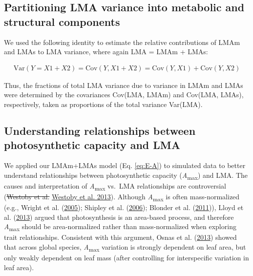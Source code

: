 \documentclass[
  12pt,
]{article}
\providecommand{\DIFdeltex}[1]{{\protect\color{red}\sout{#1}}}                      %
\providecommand{\DIFaddbegin}{} %
\providecommand{\DIFaddend}{} %
\providecommand{\DIFdelbegin}{} %
\providecommand{\DIFdelend}{} %
\providecommand{\DIFdel}[1]{\texorpdfstring{\DIFdeltex{#1}}{}} %
\newcommand{\DIFscaledelfig}{0.5}
\newlength{\DIFdelgraphicswidth} %
\newlength{\DIFdelgraphicsheight} %
\newcommand{\DIFaddincludegraphics}[2][]{{\color{blue}\fbox{\DIFOincludegraphics[#1]{#2}}}} %
\newcommand{\DIFdelincludegraphics}[2][]{%
\sbox{\DIFdelgraphicsbox}{\DIFOincludegraphics[#1]{#2}}%
\settoboxwidth{\DIFdelgraphicswidth}{\DIFdelgraphicsbox} %
\settoboxtotalheight{\DIFdelgraphicsheight}{\DIFdelgraphicsbox} %
\scalebox{\DIFscaledelfig}{%
\parbox[b]{\DIFdelgraphicswidth}{\usebox{\DIFdelgraphicsbox}\\[-\baselineskip] \rule{\DIFdelgraphicswidth}{0em}}\llap{\resizebox{\DIFdelgraphicswidth}{\DIFdelgraphicsheight}{%
\setlength{\unitlength}{\DIFdelgraphicswidth}%
\begin{picture}(1,1)%
\thicklines\linethickness{2pt} %
{\color[rgb]{1,0,0}\put(0,0){\framebox(1,1){}}}%
{\color[rgb]{1,0,0}\put(0,0){\line( 1,1){1}}}%
{\color[rgb]{1,0,0}\put(0,1){\line(1,-1){1}}}%
\end{picture}%
}\hspace*{3pt}}} %
} %
\DeclareRobustCommand{\DIFaddbegin}{\DIFOaddbegin \let\includegraphics\DIFaddincludegraphics} %
\DeclareRobustCommand{\DIFaddend}{\DIFOaddend \let\includegraphics\DIFOincludegraphics} %
\DeclareRobustCommand{\DIFdelbegin}{\DIFOdelbegin \let\includegraphics\DIFdelincludegraphics} %
\DeclareRobustCommand{\DIFdelend}{\DIFOaddend \let\includegraphics\DIFOincludegraphics} %
\begin{document}
\hypertarget{partitioning-lma-variance-into-metabolic-and-structural-components}{%
\subsection{Partitioning LMA variance into metabolic and structural components}\label{partitioning-lma-variance-into-metabolic-and-structural-components}}

We used the following identity to estimate the relative contributions of LMAm and LMAs to LMA variance, where again LMA = LMAm + LMAs:

\begin{align}
\mathrm{Var}(Y = X1 + X2) = \mathrm{Cov}(Y, X1+X2) = \mathrm{Cov}(Y,X1) + \mathrm{Cov}(Y,X2) \label{eq:var}
\end{align}

Thus, the fractions of total LMA variance due to variance in LMAm and LMAs were determined by the covariances Cov(LMA, LMAm) and Cov(LMA, LMAs), respectively, taken as proportions of the total variance Var(LMA).

\hypertarget{understanding-relationships-between-photosynthetic-capacity-and-lma}{%
\subsection{Understanding relationships between photosynthetic capacity and LMA}\label{understanding-relationships-between-photosynthetic-capacity-and-lma}}

We applied our LMAm+LMAs model (Eq. \eqref{eq:E-A}) to simulated data to better understand relationships between photosynthetic capacity (\emph{A}\textsubscript{max}) and LMA.
The causes and interpretation of \emph{A}\textsubscript{max} vs.~LMA relationships are controversial (\DIFdelbegin \DIFdel{Westoby et al. }\DIFdelend \protect\DIFdelbegin %
\DIFdelend \DIFaddbegin \hyperlink{ref-Westoby2013}{Westoby et al. 2013}\DIFaddend ).
Although \emph{A}\textsubscript{max} is often mass-normalized (e.g., Wright et al. (\protect\hyperlink{ref-Wright2005}{2005}); Shipley et al. (\protect\hyperlink{ref-Shipley2006}{2006}); Blonder et al. (\protect\hyperlink{ref-Blonder2011}{2011})), Lloyd et al. (\protect\hyperlink{ref-Lloyd2013}{2013}) argued that photosynthesis is an area-based process, and therefore \emph{A}\textsubscript{max} should be area-normalized rather than mass-normalized when exploring trait relationships.
Consistent with this argument, Osnas et al. (\protect\hyperlink{ref-Osnas2013}{2013}) showed that across global species, \emph{A}\textsubscript{max} variation is strongly dependent on leaf area, but only weakly dependent on leaf mass (after controlling for interspecific variation in leaf area).
\end{document}
